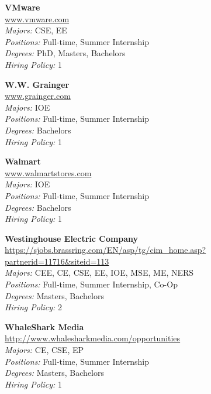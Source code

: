 \documentclass{article}
\begin{document}
\begin{center}
\begin{multicols}{3}
\begin{minipage}{.9\columnwidth}{\Large\bf VMware }\\
	\url{www.vmware.com}\\
	\emph{Majors:} CSE, EE\\
	\emph{Positions:} Full-time, Summer Internship\\
	\emph{Degrees:} PhD, Masters, Bachelors\\
	\emph{Hiring Policy:} 1\\
\end{minipage}
 
\begin{minipage}{.9\columnwidth}{\Large\bf W.W. Grainger }\\
	\url{www.grainger.com}\\
	\emph{Majors:} IOE\\
	\emph{Positions:} Full-time, Summer Internship\\
	\emph{Degrees:} Bachelors\\
	\emph{Hiring Policy:} 1\\
\end{minipage}
 
\begin{minipage}{.9\columnwidth}{\Large\bf Walmart }\\
	\url{www.walmartstores.com}\\
	\emph{Majors:} IOE\\
	\emph{Positions:} Full-time, Summer Internship\\
	\emph{Degrees:} Bachelors\\
	\emph{Hiring Policy:} 1\\
\end{minipage}
 
\begin{minipage}{.9\columnwidth}{\Large\bf Westinghouse Electric Company }\\
	\url{https://sjobs.brassring.com/EN/asp/tg/cim_home.asp?partnerid=11716&siteid=113}\\
	\emph{Majors:} CEE, CE, CSE, EE, IOE, MSE, ME, NERS\\
	\emph{Positions:} Full-time, Summer Internship, Co-Op\\
	\emph{Degrees:} Masters, Bachelors\\
	\emph{Hiring Policy:} 2\\
\end{minipage}
 
\begin{minipage}{.9\columnwidth}{\Large\bf WhaleShark Media }\\
	\url{http://www.whalesharkmedia.com/opportunities}\\
	\emph{Majors:} CE, CSE, EP\\
	\emph{Positions:} Full-time, Summer Internship\\
	\emph{Degrees:} Masters, Bachelors\\
	\emph{Hiring Policy:} 1\\
\end{minipage}
 

\end{multicols}
\end{center}
\end{document}
